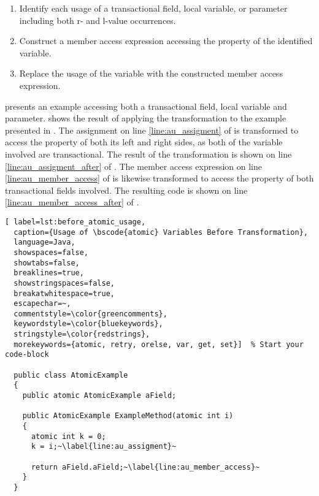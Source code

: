 \begin{enumerate}
	\item Identify each usage of a transactional field, local variable, or parameter including both r- and l-value occurrences.
	\item Construct a member access expression accessing the  property of the identified variable.
	\item Replace the usage of the variable with the constructed member access expression. 
\end{enumerate}

 presents an example accessing both a transactional field, local variable and parameter.  shows the result of applying the transformation to the example presented in . The assignment on line \ref{line:au_assigment} of  is transformed to access the  property of both its left and right sides, as both of the variable involved are transactional. The result of the transformation is shown on line \ref{line:au_assigment_after} of . The member access expression on line \ref{line:au_member_access} of  is likewise transformed to access the  property of both transactional fields involved. The resulting code is shown on line \ref{line:au_member_access_after} of .


\begin{lstlisting}[ label=lst:before_atomic_usage,
  caption={Usage of \bscode{atomic} Variables Before Transformation},
  language=Java,  
  showspaces=false,
  showtabs=false,
  breaklines=true,
  showstringspaces=false,
  breakatwhitespace=true,
  escapechar=~,
  commentstyle=\color{greencomments},
  keywordstyle=\color{bluekeywords},
  stringstyle=\color{redstrings},
  morekeywords={atomic, retry, orelse, var, get, set}]  % Start your code-block

  public class AtomicExample
  {
    public atomic AtomicExample aField;

    public AtomicExample ExampleMethod(atomic int i)
    {
      atomic int k = 0;
      k = i;~\label{line:au_assigment}~

      return aField.aField;~\label{line:au_member_access}~
    }
  }
\end{lstlisting}

